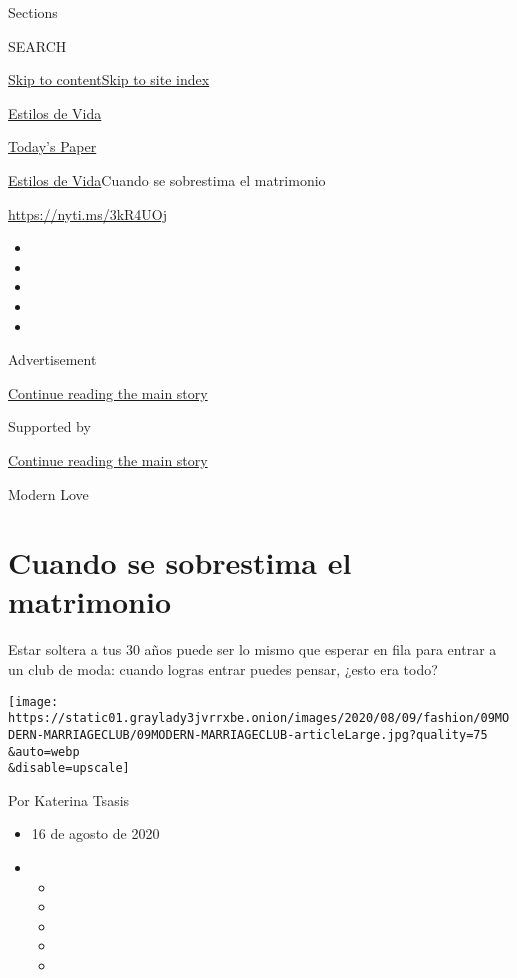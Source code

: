Sections

SEARCH

\protect\hyperlink{site-content}{Skip to
content}\protect\hyperlink{site-index}{Skip to site index}

\href{https://www.nytimes3xbfgragh.onion/es/section/estilos-de-vida}{Estilos
de Vida}

\href{https://myaccount.nytimes3xbfgragh.onion/auth/login?response_type=cookie\&client_id=vi}{}

\href{https://www.nytimes3xbfgragh.onion/section/todayspaper}{Today's
Paper}

\href{/es/section/estilos-de-vida}{Estilos de Vida}\textbar{}Cuando se
sobrestima el matrimonio

\url{https://nyti.ms/3kR4UOj}

\begin{itemize}
\item
\item
\item
\item
\item
\end{itemize}

Advertisement

\protect\hyperlink{after-top}{Continue reading the main story}

Supported by

\protect\hyperlink{after-sponsor}{Continue reading the main story}

Modern Love

\hypertarget{cuando-se-sobrestima-el-matrimonio}{%
\section{Cuando se sobrestima el
matrimonio}\label{cuando-se-sobrestima-el-matrimonio}}

Estar soltera a tus 30 años puede ser lo mismo que esperar en fila para
entrar a un club de moda: cuando logras entrar puedes pensar, ¿esto era
todo?

\texttt{[image: https://static01.graylady3jvrrxbe.onion/images/2020/08/09/fashion/09MODERN-MARRIAGECLUB/09MODERN-MARRIAGECLUB-articleLarge.jpg?quality=75\\\&auto=webp\\\&disable=upscale]}

Por Katerina Tsasis

\begin{itemize}
\item
  16 de agosto de 2020
\item
  \begin{itemize}
  \item
  \item
  \item
  \item
  \item
  \end{itemize}
\end{itemize}


